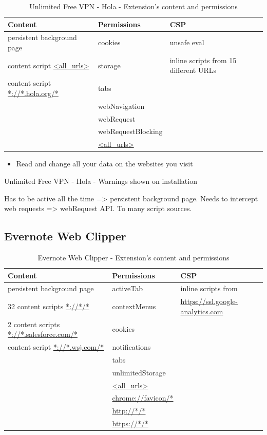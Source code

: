 \documentclass[article,colorback,accentcolor=tud9c,type=bsc]{tudthesis}
\let\stdsubsection\subsection
\renewcommand\subsection{\newpage\stdsubsection}
\begin{document}
	\begin{table}[h]
		\centering
		\begin{tabular}{|l|l|l|} \hline
			\textbf{Content} & \textbf{Permissions} & \textbf{CSP} \\ \hline
			persistent background page & cookies & unsafe eval\\
			content script  \url{<all_urls>} & storage & inline scripts from 15 different URLs \\
			content script \url{*://*.hola.org/*} & tabs & \\ 
			& webNavigation & \\ 
			& webRequest & \\ 
			& webRequestBlocking & \\ 
			& \url{<all_urls>} & \\ \hline
		\end{tabular}
		\caption{Unlimited Free VPN - Hola - Extension's content and permissions}
	\end{table}
	
	\begin{listing}
		\begin{itemize}
			\item  Read and change all your data on the websites you visit
		\end{itemize}
		\caption{Unlimited Free VPN - Hola - Warnings shown on installation}
	\end{listing}
	
	Has to be active all the time => persistent background page. Needs to intercept web requests => webRequest API. 
	To many script sources.
	
\subsection{Evernote Web Clipper}
	
	\begin{table}[h]
		\centering
		\begin{tabular}{|l|l|l|} \hline
			\textbf{Content} & \textbf{Permissions} & \textbf{CSP} \\ \hline
			persistent background page & activeTab & inline scripts from  \\
			32 content scripts  \url{*://*/*} & contextMenus & \hspace{1em} \url{https://ssl.google-analytics.com} \\
			2 content scripts \url{*://*.salesforce.com/*} & cookies & \\ 
			content script \url{*://*.wsj.com/*} & notifications & \\ 
			& tabs & \\ 
			& unlimitedStorage & \\ 
			& \url{<all_urls>} & \\ 
			& \url{chrome://favicon/*} & \\ 
			& \url{http://*/*} & \\ 
			& \url{https://*/*} & \\ \hline
		\end{tabular}
		\caption{Evernote Web Clipper - Extension's content and permissions}
	\end{table}
	
\end{document}
